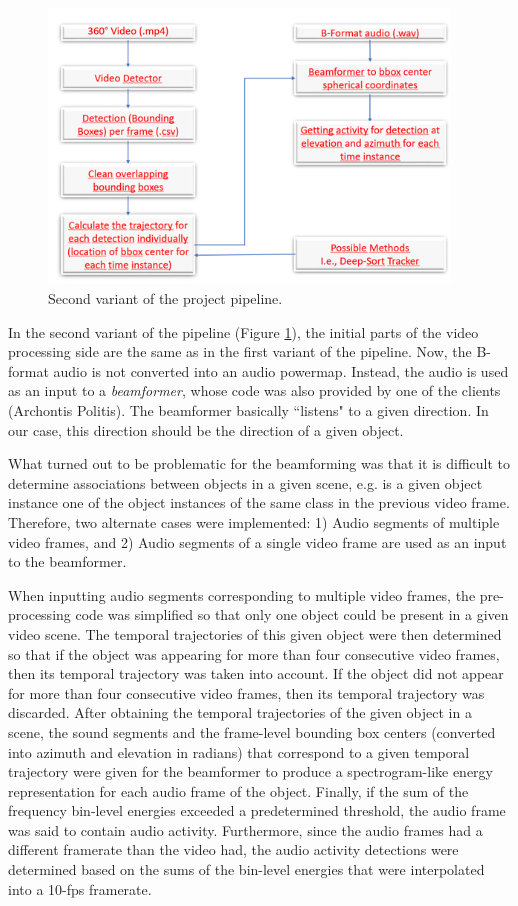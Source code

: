 \begin{figure}[h]
    \centering
    \includegraphics[width=0.95\textwidth]{figures/pipeline_2.png}
    \caption{Second variant of the project pipeline.}
    \label{fig_pipeline_2}
\end{figure}

In the second variant of the pipeline (Figure \ref{fig_pipeline_2}), the initial parts of the video processing side are the same as in the first variant of the pipeline. Now, the B-format audio is not converted into an audio powermap. Instead, the audio is used as an input to a \textit{beamformer}, whose code was also provided by one of the clients (Archontis Politis). The beamformer basically ``listens" to a given direction. In our case, this direction should be the direction of a given object.

What turned out to be problematic for the beamforming was that it is difficult to determine associations between objects in a given scene, e.g. is a given object instance one of the object instances of the same class in the previous video frame. Therefore, two alternate cases were implemented: 1) Audio segments of multiple video frames, and 2) Audio segments of a single video frame are used as an input to the beamformer.

When inputting audio segments corresponding to multiple video frames, the pre-processing code was simplified so that only one object could be present in a given video scene. The temporal trajectories of this given object were then determined so that if the object was appearing for more than four consecutive video frames, then its temporal trajectory was taken into account. If the object did not appear for more than four consecutive video frames, then its temporal trajectory was discarded. After obtaining the temporal trajectories of the given object in a scene, the sound segments and the frame-level bounding box centers (converted into azimuth and elevation in radians) that correspond to a given temporal trajectory were given for the beamformer to produce a spectrogram-like energy representation for each audio frame of the object. Finally, if the sum of the frequency bin-level energies exceeded a predetermined threshold, the audio frame was said to contain audio activity. Furthermore, since the audio frames had a different framerate than the video had, the audio activity detections were determined based on the sums of the bin-level energies that were interpolated into a 10-fps framerate.

